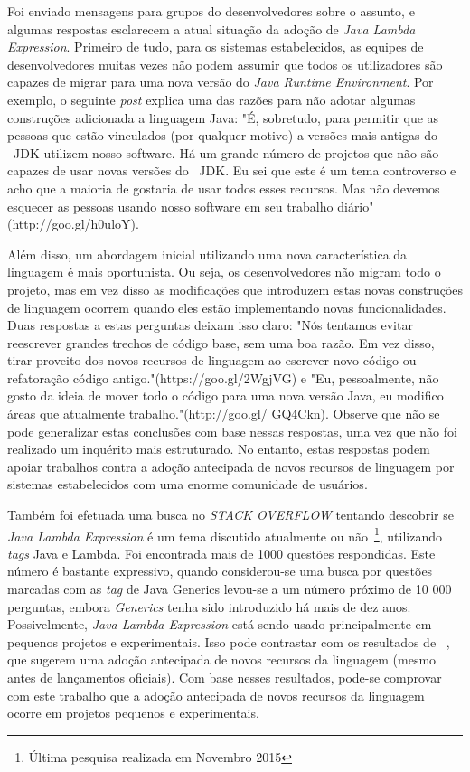 Foi enviado mensagens para grupos do desenvolvedores sobre o assunto, e algumas respostas esclarecem a atual situação da adoção de \textit{Java Lambda Expression}. Primeiro de tudo, para os sistemas estabelecidos, as equipes de desenvolvedores muitas vezes não podem assumir que todos os utilizadores são capazes de migrar para uma nova versão do \textit{Java Runtime Environment}. Por exemplo, o seguinte \textit{post} explica uma das razões para não adotar algumas construções adicionada a linguagem Java: "É, sobretudo, para permitir que as pessoas que estão vinculados (por qualquer motivo) a versões mais antigas do ~\acs{JDK} utilizem nosso software. Há um grande número de projetos que não são capazes de usar novas versões do ~\acs{JDK}. Eu sei que este é um tema controverso e acho que a maioria de gostaria de usar todos esses recursos. Mas não devemos esquecer as pessoas usando nosso software em seu trabalho diário" (http://goo.gl/h0uloY).

Além disso, um abordagem inicial utilizando uma nova característica da linguagem é mais oportunista. Ou seja, os desenvolvedores não migram todo o projeto, mas em vez disso as modificações que introduzem estas novas construções de linguagem ocorrem quando eles estão implementando novas funcionalidades. Duas respostas a estas perguntas deixam isso claro: "Nós tentamos evitar reescrever grandes trechos de código base, sem uma boa razão. Em vez disso, tirar proveito dos novos recursos de linguagem ao escrever novo código ou refatoração código antigo."(https://goo.gl/2WgjVG) e "Eu, pessoalmente, não gosto da ideia de mover todo o código para uma nova versão Java, eu modifico áreas que atualmente trabalho."(http://goo.gl/ GQ4Ckn). Observe que não se pode generalizar estas conclusões com base nessas respostas, uma vez que não foi realizado um inquérito mais estruturado. No entanto, estas respostas podem apoiar trabalhos contra a adoção antecipada de novos recursos de linguagem por sistemas estabelecidos com uma enorme comunidade de usuários.

Também foi efetuada uma busca no \textit{STACK OVERFLOW} tentando descobrir se \textit{Java Lambda Expression} é um tema discutido atualmente ou não~\footnote{Última pesquisa realizada em Novembro 2015}, utilizando \textit{tags} Java e Lambda. Foi encontrada mais de 1000 questões respondidas. Este número é bastante expressivo, quando considerou-se uma busca por questões marcadas com as \textit{tag} de Java Generics levou-se a um número próximo de 10 000 perguntas, embora \textit{Generics} tenha sido introduzido há mais de dez anos. Possivelmente, \textit{Java Lambda Expression} está sendo usado principalmente em pequenos projetos e experimentais. Isso pode contrastar com os resultados de ~\cite{Dyer:ACM2014}, que sugerem uma adoção antecipada de novos recursos da linguagem (mesmo antes de lançamentos oficiais). Com base nesses resultados, pode-se comprovar com este trabalho que a adoção antecipada de novos recursos da linguagem ocorre em projetos pequenos e experimentais.

